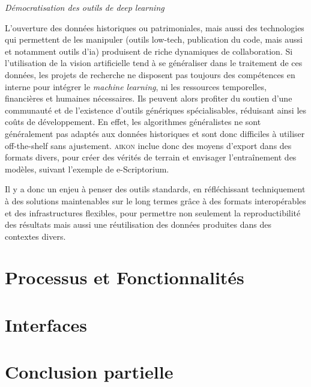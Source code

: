 \documentclass[a4paper,12pt,twoside]{book}
\newcommand{\aikon}{\textsc{aikon}\xspace}
\newcommand{\dl}{\emph{deep learning}\xspace}
\newcommand{\ia}{\gls{ia}\xspace}
\newcommand{\ml}{\emph{machine learning}\xspace}
\newcommand{\clearemptydoublepage}{\newpage{\pagestyle{empty}\cleardoublepage}}
\begin{document}
\emph{Démocratisation des outils de \dl}

L'ouverture des données historiques ou patrimoniales, mais aussi des
technologies qui permettent de les manipuler (outils low-tech,
publication du code, mais aussi et notamment outils d'\ia) produisent de
riche dynamiques de collaboration. Si l'utilisation de la vision
artificielle tend à se généraliser dans le traitement de ces données,
les projets de recherche ne disposent pas toujours des compétences en
interne pour intégrer le \ml, ni les ressources
temporelles, financières et humaines nécessaires. Ils peuvent alors profiter du
soutien d'une communauté et de l'existence d'outils génériques
spécialisables, réduisant ainsi les coûts de développement. En effet, les
algorithmes généralistes ne sont généralement pas adaptés aux données
historiques et sont donc difficiles à utiliser off-the-shelf sans
ajustement. \aikon inclue donc des moyens d'export dans des formats
divers, pour créer des vérités de terrain et envisager l'entraînement des modèles, suivant l'exemple de e-Scriptorium.

Il y a donc un enjeu à penser des outils standards, en réfléchissant
techniquement à des solutions maintenables sur le long termes grâce à
des formats interopérables et des infrastructures flexibles, pour
permettre non seulement la reproductibilité des résultats mais aussi une
réutilisation des données produites dans des contextes divers.        
            
        \clearemptydoublepage
        
        \hypertarget{chapitre-7-processus-et-fonctionnalites}{%
\chapter{Processus et
Fonctionnalités}\label{chapitre-7-processus-et-fonctionnalites}}

  
            
        \clearemptydoublepage
        
\hypertarget{chapitre-8-interfaces}{%
\chapter{Interfaces}\label{chapitre-8-interfaces}}




        \clearemptydoublepage

        \chapter*{Conclusion partielle}
\end{document}
